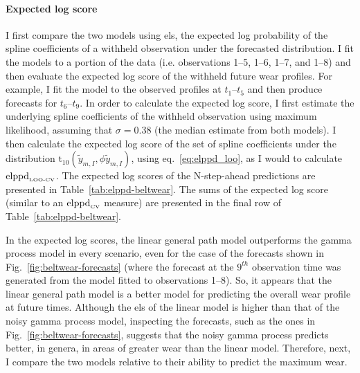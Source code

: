 \paragraph*{Expected log score}
I first compare the two models using els, the expected log probability of the spline coefficients of a withheld observation under the forecasted distribution. I fit the models to a portion of the data (i.e. observations 1--5, 1--6, 1--7, and 1--8) and then evaluate the expected log score of the withheld future wear profiles. For example, I fit the model to the observed profiles at $t_1$--$t_5$ and then produce forecasts for $t_6$--$t_9$. In order to calculate the expected log score, I first estimate the underlying spline coefficients of the withheld observation using maximum likelihood, assuming that $\sigma = 0.38$ (the median estimate from both models). I then calculate the expected log score of the set of spline coefficients under the distribution $\mbox{t}_{10}(\tilde{y}_{m, I}, \phi \tilde{y}_{m, I})$, using eq.~\eqref{eq:elppd_loo}, as I would to calculate $\hbox{elppd}_{\text{\tiny{LOO-CV}}}$. The expected log scores of the N-step-ahead predictions are presented in Table~\ref{tab:elppd-beltwear}. The sums of the expected log score (similar to an $\hbox{elppd}_{\text{\tiny{CV}}}$ measure) are presented in the final row of Table~\ref{tab:elppd-beltwear}.



In the expected log scores, the linear general path model outperforms the gamma process model in every scenario, even for the case of the forecasts shown in Fig.~\ref{fig:beltwear-forecasts} (where the forecast at the $9^{th}$ observation time was generated from the model fitted to observations 1--8). So, it appears that the linear general path model is a better model for predicting the overall wear profile at future times. Although the els of the linear model is higher than that of the noisy gamma process model, inspecting the forecasts, such as the ones in Fig.~\ref{fig:beltwear-forecasts}, suggests that the noisy gamma process predicts better, in genera, in areas of greater wear than the linear model. Therefore, next, I compare the two models relative to their ability to predict the maximum wear.

